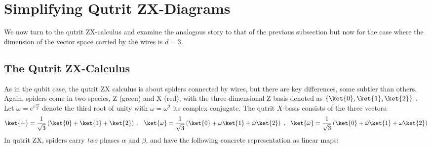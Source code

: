 \section{Simplifying Qutrit ZX-Diagrams}

We now turn to the qutrit ZX-calculus and examine the analogous story to that of the previous subsection
but now for the case where the dimension of the vector space carried by the wires is $d=3$.


\subsection{The Qutrit ZX-Calculus}


As in the qubit case, the qutrit ZX calculus is about spiders connected by wires, but there are key differences, some subtler than others.
Again, spiders come in two species, Z (green) and X (red),
with the three-dimensional Z basis denoted as $\{\ket{0},\ket{1},\ket{2}\}$ .
Let $\omega = e^{i \frac{2\pi}{3}}$ denote the third root of unity
with $\bar\omega = \omega^2$ its complex conjugate.
The qutrit $X$-basis consists of the three vectors: 
\begin{equation}
	\ket{+} = \frac{1}{\sqrt{3}} \left(\ket{0} + \ket{1} + \ket{2}\right)~,~~
	\ket{\omega} = \frac{1}{\sqrt{3}} \left(\ket{0} + \omega\ket{1} + \bar{\omega}\ket{2}\right)~,~~
	\ket{\bar{\omega}} = \frac{1}{\sqrt{3}} \left(\ket{0} + \bar{\omega}\ket{1} + \omega\ket{2}\right)
\end{equation}
In qutrit ZX,
spiders carry \textit{two} phases $\alpha$ and $\beta$,
and have the following concrete representation as linear maps:
